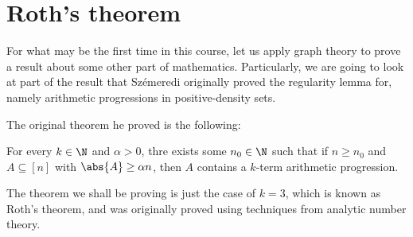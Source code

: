 \documentclass[nobib]{tufte-handout}
\begin{document}
\section{Roth's theorem}

For what may be the first time in this course, let us apply graph theory to prove a result about some other part of mathematics. Particularly, we are going to look at part of the result that Szémeredi originally proved the regularity lemma for, namely arithmetic progressions in positive-density sets.

The original theorem he proved is the following:

\begin{theorem}[Szemerédi, 1975]
    For every $k \in \N$ and $\alpha > 0$, thre exists some $n_0 \in \N$ such that if $n \geq n_0$ and $A \subseteq [n]$ with $\abs{A} \geq \alpha n$, then $A$ contains a $k$-term arithmetic progression.
\end{theorem}

The theorem we shall be proving is just the case of $k = 3$, which is known as Roth's theorem, and was originally proved using techniques from analytic number theory.
\end{document}
